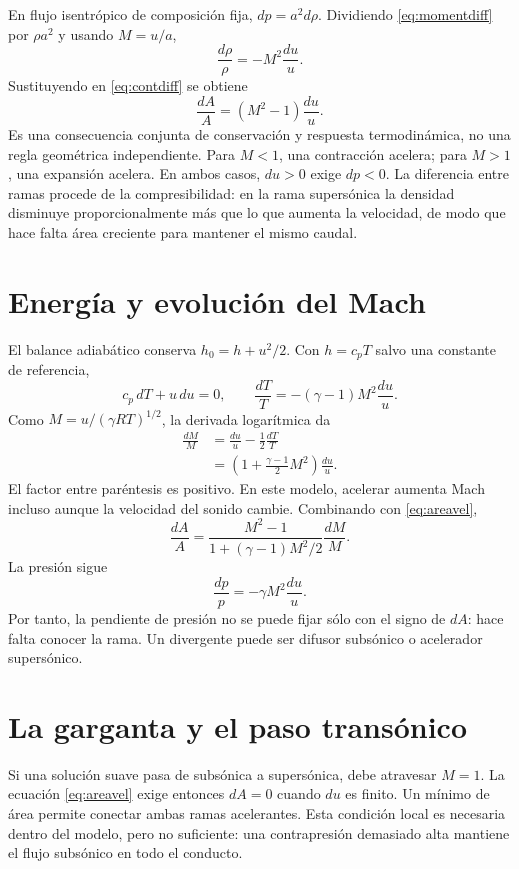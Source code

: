 En flujo isentrópico de composición fija, $dp=a^2d\rho$. Dividiendo \eqref{eq:momentdiff} por $\rho a^2$ y usando $M=u/a$,
\[
 \frac{d\rho}{\rho}=-M^2\frac{du}{u}.
\]
Sustituyendo en \eqref{eq:contdiff} se obtiene
\begin{equation}\label{eq:areavel}
 \boxed{\frac{dA}{A}=(M^2-1)\frac{du}{u}}.
\end{equation}
Es una consecuencia conjunta de conservación y respuesta termodinámica, no una regla geométrica independiente. Para $M<1$, una contracción acelera; para $M>1$, una expansión acelera. En ambos casos, $du>0$ exige $dp<0$. La diferencia entre ramas procede de la compresibilidad: en la rama supersónica la densidad disminuye proporcionalmente más que lo que aumenta la velocidad, de modo que hace falta área creciente para mantener el mismo caudal.
\section{Energía y evolución del Mach}
El balance adiabático conserva $h_0=h+u^2/2$. Con $h=c_pT$ salvo una constante de referencia,
\[
 c_p\,dT+u\,du=0,
 \qquad \frac{dT}{T}=-(\gamma-1)M^2\frac{du}{u}.
\]
Como $M=u/(\gamma RT)^{1/2}$, la derivada logarítmica da
\begin{align}
 \frac{dM}{M}&=\frac{du}{u}-\frac12\frac{dT}{T}\\
 &=\left(1+\frac{\gamma-1}{2}M^2\right)\frac{du}{u}.
\end{align}
El factor entre paréntesis es positivo. En este modelo, acelerar aumenta Mach incluso aunque la velocidad del sonido cambie. Combinando con \eqref{eq:areavel},
\begin{equation}\label{eq:areaMdiff}
 \frac{dA}{A}=\frac{M^2-1}{1+(\gamma-1)M^2/2}\frac{dM}{M}.
\end{equation}
La presión sigue
\[
 \frac{dp}{p}=-\gamma M^2\frac{du}{u}.
\]
Por tanto, la pendiente de presión no se puede fijar sólo con el signo de $dA$: hace falta conocer la rama. Un divergente puede ser difusor subsónico o acelerador supersónico.
\section{La garganta y el paso transónico}
Si una solución suave pasa de subsónica a supersónica, debe atravesar $M=1$. La ecuación \eqref{eq:areavel} exige entonces $dA=0$ cuando $du$ es finito. Un mínimo de área permite conectar ambas ramas acelerantes. Esta condición local es necesaria dentro del modelo, pero no suficiente: una contrapresión demasiado alta mantiene el flujo subsónico en todo el conducto.

